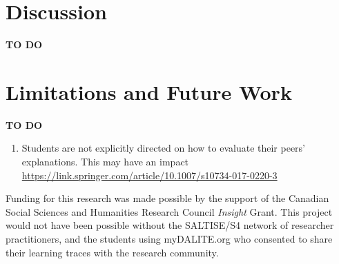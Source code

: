 \documentclass[sigconf]{acmart}
\begin{document}
\section{Discussion}
\textbf{TO DO}


\section{Limitations and Future Work}
\textbf{TO DO}

\begin{enumerate}
	\item Students are not explicitly directed on how to evaluate their peers' 
	explanations. This may have an impact 
	 \url{https://link.springer.com/article/10.1007/s10734-017-0220-3}
\end{enumerate}

\begin{acks}
Funding for this research was made possible by the support of the Canadian 
Social Sciences and Humanities Research Council \textit{Insight} Grant. This 
project would not have been possible without the SALTISE/S4 network of 
researcher practitioners, and the students using myDALITE.org who consented to 
share their learning traces with the research community.
\end{acks}



\end{document}
